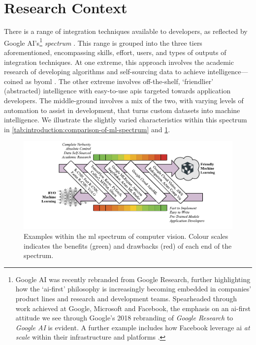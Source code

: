 \section{Research Context}
\label{sec:introduction:context}

There is a range of integration techniques available to developers, as reflected by Google AI's\footnote{
Google AI was recently rebranded from Google Research, further highlighting how the `\gls{ai}-first' philosophy is increasingly becoming embedded in companies' product lines and research and development teams. Spearheaded through work achieved at Google, Microsoft and Facebook, the emphasis on an \gls{ai}-first attitude we see through Google's 2018 rebranding of \textit{Google Research} to \textit{Google AI} \citep{Howard:2018tz} is evident. A further example includes how Facebook leverage \gls{ai} \textit{at scale} within their infrastructure and platforms \citep{Parekh:2017hx}.
} \textit{ spectrum} \citep{Ortiz:2017wg,LaForge:2018tm,McGowen:2019vt}. This range is grouped into the three tiers aforementioned, encompassing skills, effort, users, and types of outputs of integration techniques. At one extreme, this approach involves the academic research of developing algorithms and self-sourcing data to achieve intelligence---coined as \gls{byoml} \citep{Ortiz:2017wg,McGowen:2019vt,Jimerson:2017vh}. The other extreme involves off-the-shelf, `friendlier' (abstracted) intelligence with easy-to-use \glspl{api} targeted towards application developers. The middle-ground involves a mix of the two, with varying levels of automation to assist in development, that turns custom datasets into machine intelligence. 
We illustrate the slightly varied characteristics within this spectrum in \cref{tab:introduction:comparison-of-ml-spectrum} and \cref{fig:introduction:cv-spectrum}.


\begin{figure}[p]
\centering
\includegraphics[width=\linewidth]{cv-spectrum}
\caption[The spectrum of machine learning]{Examples within the \gls{ml} spectrum of computer vision. Colour scales indicates the benefits (green) and drawbacks (red) of each end of the spectrum.}
\label{fig:introduction:cv-spectrum}
\end{figure}

